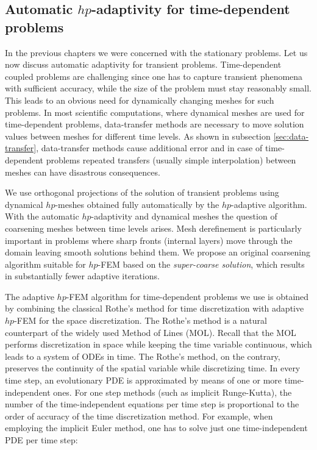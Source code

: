 \subsection{Automatic $hp$-adaptivity for time-dependent problems}

In the previous chapters we were concerned with the stationary problems. Let us now discuss automatic adaptivity for transient problems. Time-dependent coupled problems are challenging since one has to capture transient phenomena with sufficient accuracy, while the size of the problem must stay reasonably small. This leads to an obvious need for dynamically changing meshes for such problems. In most scientific computations, where dynamical meshes are used for time-dependent problems, data-transfer methods are necessary to move solution values between meshes for different time levels. As shown in subsection \ref{sec:data-transfer}, data-transfer methods cause additional error and in case of time-dependent problems repeated transfers (usually simple interpolation) between meshes can have disastrous consequences.

We use orthogonal projections of the solution of transient problems using dynamical $hp$-meshes obtained fully automatically by the $hp$-adaptive algorithm. With the automatic $hp$-adaptivity and dynamical meshes the question of coarsening meshes between time levels arises. Mesh derefinement is particularly important in problems where sharp fronts (internal layers) move through the domain leaving smooth solutions behind them. We propose an original coarsening algorithm suitable for $hp$-FEM based on the \textit{super-coarse solution}, which results in substantially fewer adaptive iterations.

The adaptive $hp$-FEM algorithm for time-dependent problems we use is obtained by combining the classical Rothe's method for time discretization with adaptive $hp$-FEM for the space discretization.
The Rothe's method is a natural counterpart of the widely used Method of Lines (MOL). 
Recall that the MOL performs discretization in space while keeping the time variable continuous, which leads to a system of ODEs in time. The Rothe's method, on the contrary, preserves the continuity of the spatial variable while discretizing time. In every time step, an evolutionary PDE is approximated by means of one or more time-independent ones. For one step methods (such as implicit Runge-Kutta), the number of the time-independent equations per time step is proportional to the order of accuracy of the time discretization method. For example, when employing the implicit Euler method, one has to solve just one time-independent PDE per time step:

